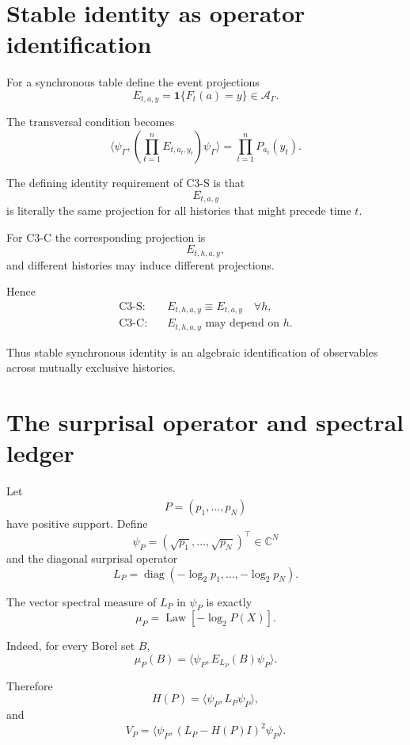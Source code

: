 \documentclass[11pt,a4paper]{article}
\newcommand{\Law}{\operatorname{Law}}
\newcommand{\cA}{\mathcal A}
\newcommand{\C}{\mathbb C}
\newcommand{\1}{\mathbf 1}
\newcommand{\ip}[2]{\langle #1,#2\rangle}
\begin{document}
\section{Stable identity as operator identification}

For a synchronous table define the event projections
\[
E_{t,a,y}
=
\1\{F_t(a)=y\}
\in\cA_\Gamma.
\tag{21.1}
\]

The transversal condition becomes
\[
\boxed{
\ip{\psi_\Gamma}{
\left(
\prod_{t=1}^n E_{t,a_t,y_t}
\right)
\psi_\Gamma
}
=
\prod_{t=1}^nP_{a_t}(y_t).
}
\tag{21.2}
\]

The defining identity requirement of C3-S is that
\[
E_{t,a,y}
\]
is literally the same projection for all histories that might precede
time \(t\).

For C3-C the corresponding projection is
\[
E_{t,h,a,y},
\tag{21.3}
\]
and different histories may induce different projections.

Hence
\[
\boxed{
\begin{aligned}
\text{C3-S:}\quad&
E_{t,h,a,y}\equiv E_{t,a,y}
\quad\forall h,
\\
\text{C3-C:}\quad&
E_{t,h,a,y}
\text{ may depend on }h.
\end{aligned}
}
\tag{21.4}
\]

Thus stable synchronous identity is an algebraic identification of
observables across mutually exclusive histories.


\section{The surprisal operator and spectral ledger}

Let
\[
P=(p_1,\ldots,p_N)
\]
have positive support.
Define
\[
\psi_P
=
(\sqrt{p_1},\ldots,\sqrt{p_N})^\top
\in\C^N
\tag{22.1}
\]
and the diagonal surprisal operator
\[
\boxed{
L_P
=
\operatorname{diag}
(-\log_2p_1,\ldots,-\log_2p_N).
}
\tag{22.2}
\]

The vector spectral measure of \(L_P\) in \(\psi_P\) is exactly
\[
\mu_P=\Law[-\log_2P(X)].
\tag{22.3}
\]

Indeed, for every Borel set \(B\),
\[
\boxed{
\mu_P(B)
=
\ip{\psi_P}{E_{L_P}(B)\psi_P}.
}
\tag{22.4}
\]

Therefore
\[
\boxed{
H(P)
=
\ip{\psi_P}{L_P\psi_P},
}
\tag{22.5}
\]
and
\[
\boxed{
V_P
=
\ip{\psi_P}{
(L_P-H(P)I)^2\psi_P
}.
}
\tag{22.6}
\]
\end{document}
